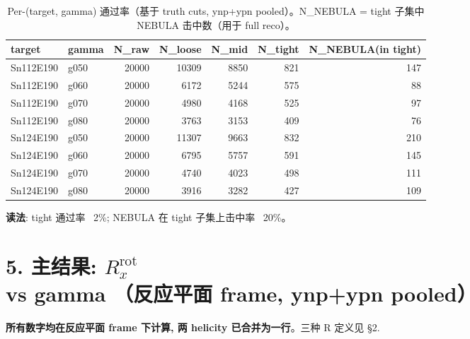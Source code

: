 \documentclass[a4paper,11pt]{article}
\begin{document}
\begin{table}[H]
\centering\footnotesize
\caption{Per-(target, gamma) 通过率（基于 truth cuts, ynp+ypn pooled）。N\_NEBULA = tight 子集中 NEBULA 击中数（用于 full reco）。}
\begin{tabular}{llrrrrr}
\toprule
target & gamma & N\_raw & N\_loose & N\_mid & N\_tight & N\_NEBULA(in tight) \\
\midrule
Sn112E190 & g050 & 20000 & 10309 & 8850 & 821 & 147 \\
Sn112E190 & g060 & 20000 & 6172 & 5244 & 575 & 88 \\
Sn112E190 & g070 & 20000 & 4980 & 4168 & 525 & 97 \\
Sn112E190 & g080 & 20000 & 3763 & 3153 & 409 & 76 \\
Sn124E190 & g050 & 20000 & 11307 & 9663 & 832 & 210 \\
Sn124E190 & g060 & 20000 & 6795 & 5757 & 591 & 145 \\
Sn124E190 & g070 & 20000 & 4740 & 4023 & 498 & 111 \\
Sn124E190 & g080 & 20000 & 3916 & 3282 & 427 & 109 \\
\bottomrule
\end{tabular}
\end{table}

\textbf{读法}: tight 通过率 ~2\%; NEBULA 在 tight 子集上击中率 ~20\%。
\section{5. 主结果: $R_x^\text{rot}$ vs gamma （反应平面 frame, ynp+ypn pooled）}

\textbf{所有数字均在反应平面 frame 下计算, 两 helicity 已合并为一行}。三种 R 定义见 §2.
\end{document}
